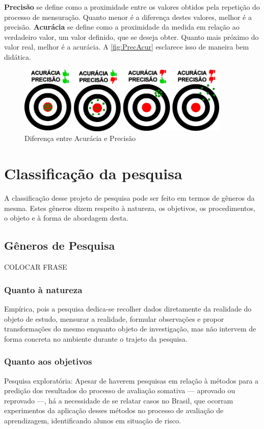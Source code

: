 \textbf{Precisão} se define como a proximidade entre os valores obtidos pela repetição do processo de mensuração. Quanto menor é a diferença destes valores, melhor é a precisão. \textbf{Acurácia} se define como a proximidade da medida em relação ao verdadeiro valor, um valor definido, que se deseja obter. Quanto mais próximo do valor real, melhor é a acurácia. A \autoref{fig:PrecAcur} esclarece isso de maneira bem didática.

\begin{figure}
    \centering
    \includegraphics[width=0.9\textwidth]{modelo-monografia-rej-2018/img/PrecisaoAcuracia.jpg}
    \caption{Diferença entre Acurácia e Precisão}
    \label{fig:PrecAcur}
\end{figure}

\section{Classificação da pesquisa}
\label{sec:classif}
A classificação desse projeto de pesquisa pode ser feito em termos de gêneros da mesma. Estes gêneros dizem respeito à natureza, os objetivos, os procedimentos, o objeto e à forma de abordagem desta.

\subsection{Gêneros de Pesquisa}

{\color{red} COLOCAR FRASE}

\subsubsection{Quanto à natureza}
Empírica, pois a pesquisa dedica-se recolher dados diretamente da realidade do objeto de estudo, mensurar a realidade, formular observações e propor transformações do mesmo enquanto objeto de investigação, mas não intervem de forma concreta no ambiente durante o trajeto da pesquisa.

\subsubsection{Quanto aos objetivos}
Pesquisa exploratória: Apesar de haverem pesquisas em relação à métodos para a predição dos resultados do processo de avaliação somativa --- aprovado ou reprovado ---, há a necessidade de se relatar casos no Brasil, que ocorram experimentos da aplicação desses métodos no processo de avaliação de aprendizagem, identificando alunos em situação de risco.

